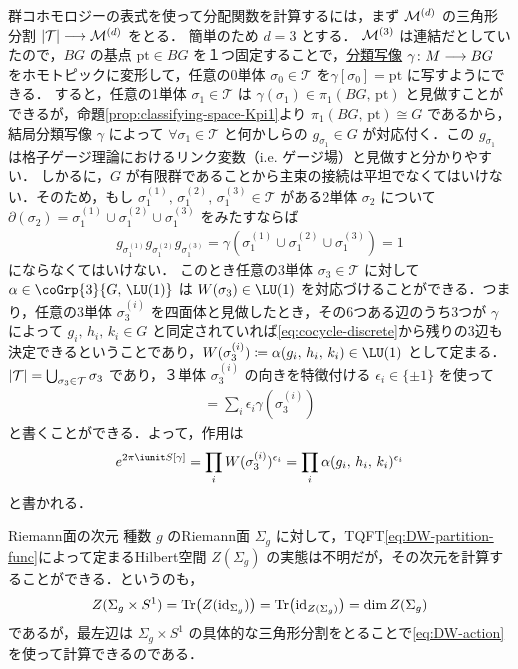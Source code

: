 \documentclass[TQFT_main]{subfiles}
\begin{document}
群コホモロジーの表式を使って分配関数を計算するには，まず $\mathcal{M}^{(d)}$ の三角形分割 $\abs{\mathcal{T}} \longrightarrow \mathcal{M}^{(d)}$ をとる．
簡単のため $d=3$ とする．
$\mathcal{M}^{(3)}$ は連結だとしていたので，$BG$ の基点 $\mathrm{pt} \in BG$ を１つ固定することで，\hyperref[prop:universal-basic]{分類写像} $\gamma \colon M \longrightarrow BG$ をホモトピックに変形して，任意の0単体 $\sigma_0 \in \mathcal{T}$ を$\gamma[\sigma_0] = \mathrm{pt}$ に写すようにできる．
すると，任意の1単体 $\sigma_1 \in \mathcal{T}$ は $\gamma(\sigma_1) \in \pi_1(BG,\, \mathrm{pt})$ と見做すことができるが，命題\ref{prop:classifying-space-Kpi1}より $\pi_1(BG,\, \mathrm{pt}) \cong G$ であるから，結局分類写像 $\gamma$ によって $\forall \sigma_1 \in \mathcal{T}$ と何かしらの $g_{\sigma_1} \in G$ が対応付く．この $g_{\sigma_1}$ は格子ゲージ理論におけるリンク変数（i.e. ゲージ場）と見做すと分かりやすい．
しかるに，$G$ が有限群であることから主束の接続は平坦でなくてはいけない．そのため，もし $\sigma^{(1)}_1,\, \sigma^{(2)}_1,\, \sigma^{(3)}_1 \in \mathcal{T}$ がある2単体 $\sigma_2$ について $\partial(\sigma_2) = \sigma^{(1)}_1 \cup \sigma^{(2)}_1 \cup \sigma^{(3)}_1$ をみたすならば
\begin{align}
    \label{eq:cocycle-discrete}
    g_{\sigma_1^{(1)}} g_{\sigma_1^{(2)}} g_{\sigma_1^{(3)}} = \gamma(\sigma^{(1)}_1 \cup \sigma^{(2)}_1 \cup \sigma^{(3)}_1) = 1
\end{align}
にならなくてはいけない．
このとき任意の3単体 $\sigma_3 \in \mathcal{T}$ に対して $\alpha \in \coGrp{3}{G,\, \LU(1)}$ は $W(\sigma_3) \in \LU(1)$ を対応づけることができる．つまり，任意の3単体 $\sigma^{(i)}_3$ を四面体と見做したとき，その6つある辺のうち3つが $\gamma$ によって $g_i,\, h_i,\, k_i \in G$ と同定されていれば\eqref{eq:cocycle-discrete}から残りの3辺も決定できるということであり，$W(\sigma_3^{(i)}) \coloneqq \alpha (g_i,\, h_i,\, k_i) \in \LU(1)$ として定まる．
$\abs{\mathcal{T}} = \bigcup_{\sigma_3 \in \mathcal{T}} \sigma_3$ であり，３単体 $\sigma_3^{(i)}$ の向きを特徴付ける $\epsilon_i \in \{\pm 1\}$ を使って
\begin{align}
    [M] = \sum_i \epsilon_i \gamma(\sigma_3^{(i)})
\end{align}
と書くことができる．よって，作用は
\begin{align}
    \label{eq:DW-action}
    e^{2\pi \iunit S[\gamma]} = \prod_i W(\sigma_3^{(i)})^{\epsilon_i} = \prod_{i} \alpha (g_{i},\, h_i,\, k_i)^{\epsilon_i}
\end{align}
と書かれる．

\begin{myexample}[label=ex:DW-Riemannian]{Riemann面の次元}
    種数 $g$ のRiemann面 $\Sigma_g$ に対して，TQFT\eqref{eq:DW-partition-func}によって定まるHilbert空間 $Z(\Sigma_g)$ の実態は不明だが，その次元を計算することができる．というのも，
    \begin{align}
        Z(\Sigma_g \times S^1) = \Tr \bigl(Z(\mathrm{id}_{\Sigma_g})\bigr) = \Tr \bigl( \mathrm{id}_{Z(\Sigma_g)} \bigr) = \dim Z(\Sigma_g)
    \end{align}
    であるが，最左辺は $\Sigma_g \times S^1$ の具体的な三角形分割をとることで\eqref{eq:DW-action}を使って計算できるのである．
\end{myexample}
\end{document}
